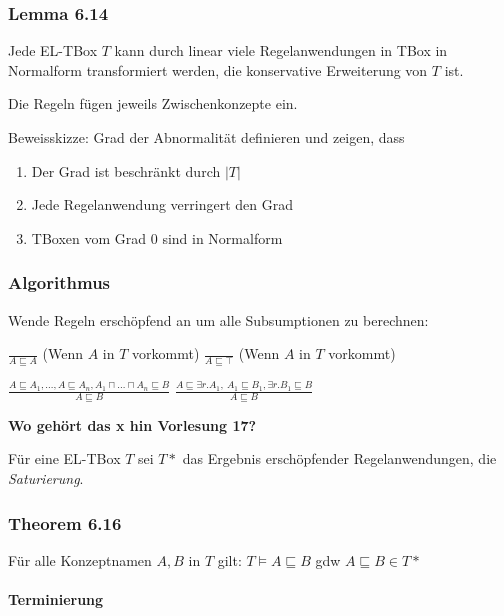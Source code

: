 \subsubsection{Lemma 6.14}\label{lemma-6.14-1}

Jede EL-TBox $T$ kann durch linear viele Regelanwendungen in TBox in
Normalform transformiert werden, die konservative Erweiterung von $T$
ist.

Die Regeln fügen jeweils Zwischenkonzepte ein.

Beweisskizze: Grad der Abnormalität definieren und zeigen, dass

\begin{enumerate}
\def\labelenumi{\arabic{enumi}.}
\item
  Der Grad ist beschränkt durch $\left| T \right|$
\item
  Jede Regelanwendung verringert den Grad
\item
  TBoxen vom Grad $0$ sind in Normalform
\end{enumerate}

\subsubsection{Algorithmus}\label{algorithmus}

Wende Regeln erschöpfend an um alle Subsumptionen zu berechnen:

$\frac{\ }{A \sqsubseteq A}$ (Wenn $A$ in $T$ vorkommt)
$\frac{\ }{A \sqsubseteq \top}$ (Wenn $A$ in $T$ vorkommt)

$\frac{A \sqsubseteq A_1,\ldots,A \sqsubseteq A_{n},A_1 \sqcap \ldots \sqcap A_{n} \sqsubseteq B}{A \sqsubseteq B}$
$\frac{A \sqsubseteq \exists r.A_1,\ A_1 \sqsubseteq B_1,\exists r.B_1 \sqsubseteq B}{A \sqsubseteq B}$

\textbf{Wo gehört das x hin Vorlesung 17?}

Für eine EL-TBox $T$ sei $T*$ das Ergebnis erschöpfender
Regelanwendungen, die \emph{Saturierung}.

\subsubsection{Theorem 6.16 }\label{theorem-6.16}

Für alle Konzeptnamen $A,B$ in $T$ gilt:
$T \models A \sqsubseteq B$ gdw $A \sqsubseteq B \in T*$

\paragraph{Terminierung}\label{terminierung-1}

